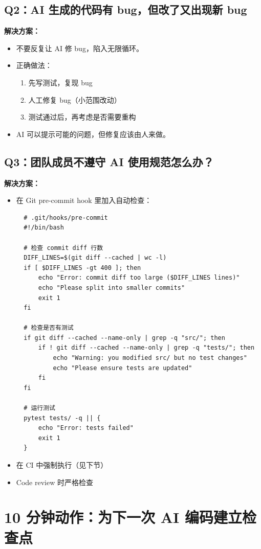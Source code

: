 \subsection{Q2：AI 生成的代码有 bug，但改了又出现新 bug}

\textbf{解决方案：}
\begin{itemize}
  \item 不要反复让 AI 修 bug，陷入无限循环。
  \item 正确做法：
  \begin{enumerate}
    \item 先写测试，复现 bug
    \item 人工修复 bug（小范围改动）
    \item 测试通过后，再考虑是否需要重构
  \end{enumerate}
  \item AI 可以提示可能的问题，但修复应该由人来做。
\end{itemize}

\subsection{Q3：团队成员不遵守 AI 使用规范怎么办？}

\textbf{解决方案：}
\begin{itemize}
  \item 在 Git pre-commit hook 里加入自动检查：
  \begin{verbatim}
  # .git/hooks/pre-commit
  #!/bin/bash

  # 检查 commit diff 行数
  DIFF_LINES=$(git diff --cached | wc -l)
  if [ $DIFF_LINES -gt 400 ]; then
      echo "Error: commit diff too large ($DIFF_LINES lines)"
      echo "Please split into smaller commits"
      exit 1
  fi

  # 检查是否有测试
  if git diff --cached --name-only | grep -q "src/"; then
      if ! git diff --cached --name-only | grep -q "tests/"; then
          echo "Warning: you modified src/ but no test changes"
          echo "Please ensure tests are updated"
      fi
  fi

  # 运行测试
  pytest tests/ -q || {
      echo "Error: tests failed"
      exit 1
  }
  \end{verbatim}

  \item 在 CI 中强制执行（见下节）
  \item Code review 时严格检查
\end{itemize}

\section{10 分钟动作：为下一次 AI 编码建立检查点}

